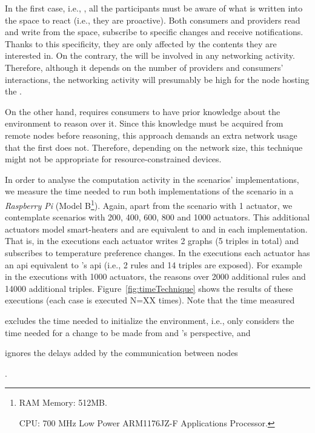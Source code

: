 In the first case, i.e., \spaceActuation{}, all the participants must be aware of what is written into the space to react (i.e., they are proactive).
Both consumers and providers read and write from the space, subscribe to specific changes and receive notifications.
Thanks to this specificity, they are only affected by the contents they are interested in. %
On the contrary, the \Space{} will be involved in any networking activity.
Therefore, although it depends on the number of providers and consumers' interactions, the networking activity will presumably be high for the node hosting the \Space{}.


On the other hand, \restActuation{} requires consumers to have prior knowledge about the environment to reason over it. %
Since this knowledge must be acquired from remote nodes before reasoning, this approach demands an extra network usage that the first does not.
Therefore, depending on the network size, this technique might not be appropriate for resource-constrained devices.


\bigskip


In order to analyse the computation activity in the scenarios' implementations, we measure the time needed to run both implementations of the scenario in a \emph{Raspberry Pi} (Model B\footnote{
RAM Memory: 512MB.

CPU: 700 MHz Low Power ARM1176JZ-F Applications Processor.
}).
Again, apart from the scenario with 1 actuator, we contemplate scenarios with 200, 400, 600, 800 and 1000 actuators.
This additional actuators model smart-heaters and are equivalent to \nodeProvSpace{} and \nodeProvRest{} in each implementation.
That is, in the \spaceActuation{} executions each actuator writes 2 graphs (5 triples in total) and subscribes to temperature preference changes.
In the \restActuation{} executions each actuator has an \ac{api} equivalent to \nodeProvRest{}'s \ac{api} (i.e., 2 rules and 14 triples are exposed).
For example in the \nodeProvRest{} executions with 1000 actuators, the \nodeConsRest{} reasons over 2000 additional rules and 14000 additional triples.
Figure~\ref{fig:timeTechnique} shows the results of these executions (each case is executed N=XX times).
Note that the time measured 
\begin{enumerate*}[label=\itshape\bfseries(\arabic*\upshape)]
  \item excludes the time needed to initialize the environment, i.e., only considers the time needed for a change to be made from \nodeConsSpace{} and \nodeConsRest{}'s  perspective, and
  \item ignores the delays added by the communication between nodes %
\end{enumerate*}.

